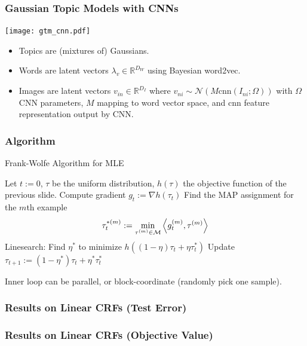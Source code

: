 \documentclass{beamer}
\begin{document}
\begin{frame}
  \frametitle{Gaussian Topic Models with CNNs}
  \begin{center}
    \texttt{[image: gtm\_cnn.pdf]}
    \begin{itemize}
    \item Topics are (mixtures of) Gaussians.
    \item Words are latent vectors $\lambda_v \in \mathbb{R}^{D_W}$ using Bayesian word2vec.
    \item Images are latent vectors $v_{in} \in \mathbb{R}^{D_I}$ where $v_{ni} \sim \mathcal{N}(M \text{cnn}(I_{ni} ; \Omega))$ with $\Omega$ CNN parameters, $M$ mapping to word vector space, and $\text{cnn}$ feature representation output by CNN.
    \end{itemize}
  \end{center}
\end{frame}

\begin{frame}
  \frametitle{Algorithm}
  \begin{algorithm}[H]
      \caption{Frank-Wolfe Algorithm for MLE}
    \begin{algorithmic}
      \State Let $t := 0$, $\tau$ be the uniform distribution, $h(\tau)$ the objective function of the previous slide.
      \Repeat
        \State Compute gradient $g_t := \nabla h(\tau_t)$
          \State Find the MAP assignment for the $m$th example $$\tau_{t}^{*(m)}:=\min_{\tau^{(m)}\in{\cal M}}\left\langle g^{(m)}_t,\tau^{(m)}\right\rangle$$
        \EndFor
        \State Linesearch: Find $\eta^{*}$ to minimize $h((1 - \eta)\tau_t + \eta\tau_{t}^{*})$
        \State Update $\tau_{t+1} := (1 - \eta^{*})\tau_t + \eta^{*}\tau_{t}^{*}$
       
    \end{algorithmic}
  \end{algorithm}
  Inner loop can be parallel, or block-coordinate (randomly pick one sample).
\end{frame}

\begin{frame}
  \frametitle{Results on Linear CRFs (Test Error)}
\end{frame}

\begin{frame}
  \frametitle{Results on Linear CRFs (Objective Value)}
\end{frame}
\end{document}
